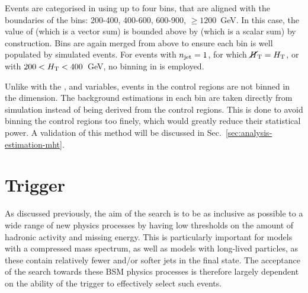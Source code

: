Events are categorised in \mht using up to four bins, that are aligned with the 
boundaries of the \scalht bins: 200-400, 400-600, 600-900, $\geq1200$~GeV. In 
this case, the value of \mht (which is a vector sum) is bounded above by 
\scalht (which is a scalar sum) by construction. Bins 
are again merged from above 
to ensure each bin is well populated by simulated events. %
For events with $n_{\text{jet}}=1$, for which 
$\mbox{$\cancel{H}_\text{T}$}=\mbox{$H_\text{T}$}$, or with $200<\mbox{$H_\text{T}$}<400$~GeV, no binning in \mht is employed.

Unlike with the \njet, \nb and \scalht variables, events in the control regions 
are not binned in the \mht dimension. The background estimations in each \mht 
bin are taken directly from simulation instead of being derived from the 
control regions. This is done to avoid binning the control regions too finely, 
which %
would greatly reduce their 
statistical power. A validation of this method will be discussed in 
Sec.~\ref{sec:analysis-estimation-mht}.



\section{Trigger}
\label{sec:analysis-trigger}

As discussed previously, %
the aim of the search is to be as inclusive as possible to a wide range of new 
physics processes by having low thresholds on the amount of hadronic activity 
and missing energy. This is particularly important for models with a compressed 
mass spectrum, as well as models with long-lived particles, as these contain 
relatively fewer and/or softer jets in the final state. The acceptance of the 
search towards these BSM physics processes is therefore largely dependent on 
the ability of the trigger to effectively select such events. 

